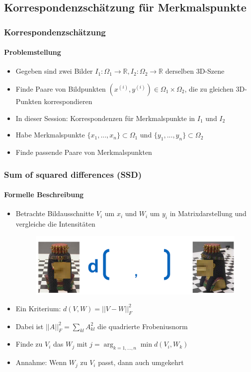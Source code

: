 \documentclass[12pt, a4paper, oneside]{article}
\begin{document}
\subsection{Korrespondenzschätzung für Merkmalspunkte}

\subsubsection{Korrespondenzschätzung}
\paragraph*{Problemstellung}
\begin{itemize}
  \item Gegeben sind zwei Bilder $I_1:\Omega_1\to\mathbb{R}, I_2:\Omega_2\to\mathbb{R}$ derselben 3D-Szene
  \item Finde Paare von Bildpunkten $(x^{(i)},y^{(i)})\in \Omega_1\times\Omega_2$, die zu gleichen 3D-Punkten korrespondieren
\end{itemize}

\begin{itemize}
  \item In dieser Session: Korrespondenzen für Merkmalspunkte in $I_1$ und $I_2$
  \item Habe Merkmalspunkte $\{x_1,...,x_n\}\subset\Omega_1$ und $\{y_1,...,y_n\}\subset\Omega_2$
  \item Finde passende Paare von Merkmalspunkten
\end{itemize}

\subsubsection{Sum of squared differences (SSD)}
\paragraph*{Formelle Beschreibung}
\begin{itemize}
  \item Betrachte Bildausschnitte $V_i$ um $x_i$ und $W_i$ um $y_i$ in Matrixdarstellung und vergleiche die Intensitäten
  \begin{figure}[htbp]
      \centering
      \includegraphics[scale=0.6]{../img/1-14.png}
      \label{img/1-14}
  \end{figure}
  \item Ein Kriterium: $d(V,W)=||V-W||_F^2$
  \item Dabei ist $||A||_F^2=\sum\limits_{kl}A_{kl}^2$ die quadrierte Frobeniusnorm
  \item Finde zu $V_i$ das $W_j$ mit $j=\arg_{k=1,...,n}\min d(V_i,W_k)$
  \item Annahme: Wenn $W_j$ zu $V_i$ passt, dann auch umgekehrt
\end{itemize}
\end{document}
